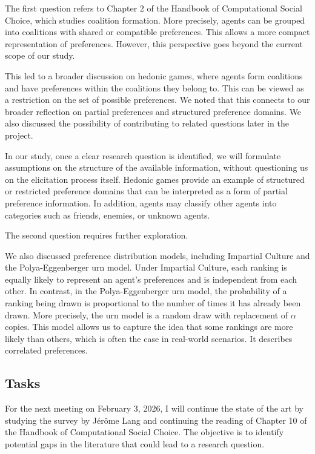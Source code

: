 \documentclass{article}
\begin{document}
The first question refers to Chapter 2 of the Handbook of Computational Social Choice, which studies coalition formation.
More precisely, agents can be grouped into coalitions with shared or compatible preferences.
This allows a more compact representation of preferences.
However, this perspective goes beyond the current scope of our study.

This led to a broader discussion on hedonic games, where agents form coalitions and have preferences within the coalitions they belong to.
This can be viewed as a restriction on the set of possible preferences.
We noted that this connects to our broader reflection on partial preferences and structured preference domains.
We also discussed the possibility of contributing to related questions later in the project.

In our study, once a clear research question is identified, we will formulate assumptions on the structure of the available information, without questioning us on the elicitation process itself.
Hedonic games provide an example of structured or restricted preference domains that can be interpreted as a form of partial preference information.
In addition, agents may classify other agents into categories such as friends, enemies, or unknown agents.

The second question requires further exploration.

We also discussed preference distribution models, including Impartial Culture and the Polya-Eggenberger urn model.
Under Impartial Culture, each ranking is equally likely to represent an agent's preferences and is independent from each other.
In contrast, in the Polya-Eggenberger urn model, the probability of a ranking being drawn is proportional to the number of times it has already been drawn. More precisely, the urn model is a random draw with replacement of $\alpha$ copies.
This model allows us to capture the idea that some rankings are more likely than others, which is often the case in real-world scenarios. It describes correlated preferences.

\subsection{Tasks}

For the next meeting on February 3, 2026, I will continue the state of the art by studying the survey by Jérôme Lang and continuing the reading of Chapter 10 of the Handbook of Computational Social Choice.
The objective is to identify potential gaps in the literature that could lead to a research question.
\end{document}

